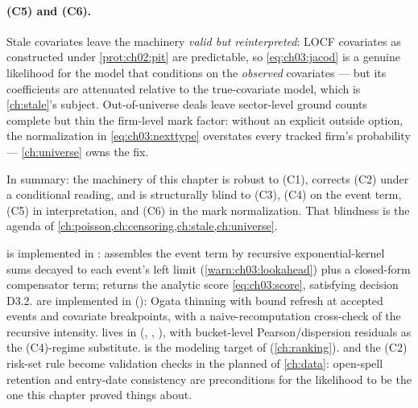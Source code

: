 \paragraph{(C5) and (C6).}
Stale covariates leave the machinery \emph{valid but reinterpreted}: LOCF
covariates as constructed under \cref{prot:ch02:pit} are predictable, so
\cref{eq:ch03:jacod} is a genuine likelihood for the model that
conditions on the \emph{observed} covariates --- but its coefficients are
attenuated relative to the true-covariate model, which is
\cref{ch:stale}'s subject. Out-of-universe deals leave sector-level
ground counts complete but thin the firm-level mark factor: without an
explicit outside option, the normalization in
\cref{eq:ch03:nexttype} overstates every tracked firm's probability ---
\cref{ch:universe} owns the fix.

In summary: the machinery of this chapter is robust to (C1), corrects
(C2) under a conditional reading, and is structurally blind to (C3),
(C4) on the event term, (C5) in interpretation, and (C6) in the mark
normalization. That blindness is the agenda of
\cref{ch:poisson,ch:censoring,ch:stale,ch:universe}.

\begin{codehooks}
 is implemented in :
 assembles the event term by recursive
exponential-kernel sums decayed to each event's left limit
(\cref{warn:ch03:lookahead}) plus a closed-form compensator term;
 returns the analytic score
\cref{eq:ch03:score}, satisfying decision D3.2.
 are implemented in
 ():
Ogata thinning with bound refresh at accepted events and covariate
breakpoints, with a naive-recomputation cross-check of the recursive
intensity.  lives in 
(, ,
), with bucket-level Pearson/dispersion residuals as the
(C4)-regime substitute.  is the modeling target
of  (\cref{ch:ranking}).
 and the (C2) risk-set rule become validation
checks in the planned  of \cref{ch:data}:
open-spell retention and entry-date consistency are preconditions for the
likelihood to be the one this chapter proved things about.
\end{codehooks}
